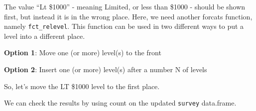 \documentclass[]{tufte-book}
\newenvironment{Shaded}{}{}
\newcommand{\KeywordTok}[1]{\textcolor[rgb]{0.00,0.44,0.13}{\textbf{#1}}}
\newcommand{\DataTypeTok}[1]{\textcolor[rgb]{0.56,0.13,0.00}{#1}}
\newcommand{\StringTok}[1]{\textcolor[rgb]{0.25,0.44,0.63}{#1}}
\newcommand{\OperatorTok}[1]{\textcolor[rgb]{0.40,0.40,0.40}{#1}}
\newcommand{\NormalTok}[1]{#1}
\begin{document}
The value ``Lt \$1000'' - meaning Limited, or less than \$1000 - should
be shown first, but instead it is in the wrong place. Here, we need
another forcats function, namely \texttt{fct\_relevel}. This function
can be used in two different ways to put a level into a different place.

\textbf{Option 1}: Move one (or more) level(s) to the front

\begin{Shaded}
\end{Shaded}

\textbf{Option 2}: Insert one (or more) level(s) after a number N of
levels

\begin{Shaded}
\end{Shaded}

So, let's move the LT \$1000 level to the first place.

\begin{Shaded}
\end{Shaded}

We can check the results by using count on the updated \texttt{survey}
data.frame.

\begin{Shaded}
\end{Shaded}
\end{document}
